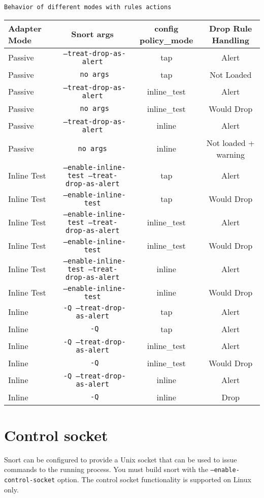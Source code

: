 \documentclass[english]{report}
\begin{document}
\texttt{Behavior of different modes with rules actions}


\begin{tabular}{|l|c|c|c|}
\hline
Adapter Mode & Snort args & config policy\_mode & Drop Rule Handling\\
\hline
\hline
Passive & \texttt{ --treat-drop-as-alert} & tap & Alert\\
\hline
Passive & \texttt{ no args} & tap & Not Loaded\\
\hline
Passive & \texttt{ --treat-drop-as-alert} & inline\_test & Alert\\
\hline
Passive & \texttt{ no args} & inline\_test & Would Drop\\
\hline
Passive & \texttt{ --treat-drop-as-alert} & inline & Alert\\
\hline
Passive & \texttt{no args} & inline & Not loaded + warning\\
\hline
Inline Test & \texttt{ --enable-inline-test --treat-drop-as-alert} & tap & Alert\\
\hline
Inline Test & \texttt{ --enable-inline-test} & tap & Would Drop\\
\hline
Inline Test & \texttt{ --enable-inline-test --treat-drop-as-alert} & inline\_test & Alert\\
\hline
Inline Test & \texttt{ --enable-inline-test} & inline\_test & Would Drop\\
\hline
Inline Test & \texttt{ --enable-inline-test --treat-drop-as-alert} & inline & Alert\\
\hline
Inline Test  & \texttt{ --enable-inline-test} & inline & Would Drop\\
\hline
Inline & \texttt{ -Q --treat-drop-as-alert} & tap & Alert\\
\hline
Inline & \texttt{ -Q} & tap & Alert\\
\hline
Inline & \texttt{ -Q --treat-drop-as-alert} & inline\_test & Alert\\
\hline
Inline & \texttt{ -Q} & inline\_test & Would Drop\\
\hline
Inline & \texttt{ -Q --treat-drop-as-alert} & inline & Alert\\
\hline
Inline & \texttt{ -Q} & inline & Drop\\
\hline
\end{tabular}

\section{Control socket}
\label{control_socket}
Snort can be configured to provide a Unix socket that can be used to issue commands 
to the running process. You must build snort with the 
\texttt{--enable-control-socket} option.  The control socket
functionality is supported on Linux only.\\
\end{document}
